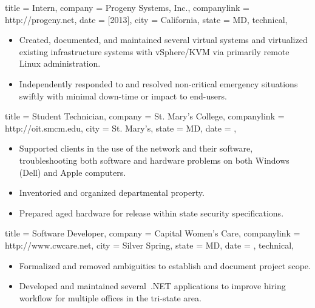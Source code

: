 \documentclass{simplecv}
\begin{document}
\begin{position}
  {
    title   = Intern,
    company = {Progeny Systems, Inc.},
    companylink = http://progeny.net,
    date    = [2013],
    city    = California,
    state   = MD,
    technical,
  }

\begin{itemize}
\item Created, documented, and maintained several virtual systems
  and virtualized existing infrastructure systems with vSphere\slash KVM via primarily remote Linux administration.
\item Independently responded to and resolved non-critical emergency situations swiftly
  with minimal down-time or impact to end-users.
\end{itemize}
\end{position}

\begin{position}
  {
    title   = Student Technician,
    company = St. Mary's College,%
    companylink = http://oit.smcm.edu,
    city    = St. Mary's,
    state   = MD,
    date    = ,
  }

\begin{itemize}
\item Supported clients in the use of the network and their software,
  troubleshooting both software and hardware problems on both Windows (Dell) and Apple computers.
\item Inventoried and organized departmental property.
\item Prepared aged hardware for release within state security specifications.
\end{itemize}
\end{position}

\begin{position}
  {
    title   = Software Developer,
    company = Capital Women's Care,
    companylink = http://www.cwcare.net,
    city    = Silver Spring,
    state   = MD,
    date    = ,
    technical,
  }

\begin{itemize}
\item Formalized and removed ambiguities to establish and document project scope.
\item Developed and maintained several \CSharp\,.NET applications to
  improve hiring workflow for multiple offices in the tri-state area.
\end{itemize}
\end{position}
\vfill
\end{document}
